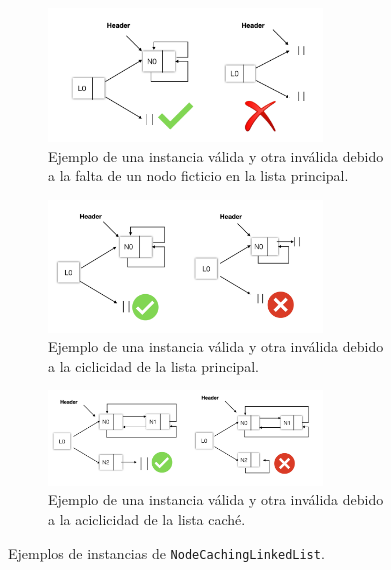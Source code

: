 \begin{figure}[p]
    \centering
    \begin{subfigure}[b]{\textwidth}
        \centering
        \includegraphics[width=0.8\textwidth]{images/repOK1.jpg}
        \caption{Ejemplo de una instancia válida y otra inválida debido a la
            falta de un nodo ficticio en la lista principal.}
        \label{fig:repOKa}
    \end{subfigure}

    \vspace{10pt}
    \begin{subfigure}[b]{\textwidth}
        \centering
        \includegraphics[width=0.8\textwidth]{images/repOK2.jpg}
        \caption{Ejemplo de una instancia válida y otra inválida debido a la
            ciclicidad de la lista principal.}
        \label{fig:repOKb}
    \end{subfigure}

    \vspace{10pt}

    \begin{subfigure}[b]{\textwidth}
        \centering
        \includegraphics[width=0.8\textwidth]{images/repOK3.jpg}
        \caption{Ejemplo de una instancia válida y otra inválida debido a la
            aciclicidad de la lista caché.}
        \label{fig:repOKc}
    \end{subfigure}

    \caption{Ejemplos de instancias de \texttt{NodeCachingLinkedList}.}
    \label{fig:repOK}
\end{figure}



